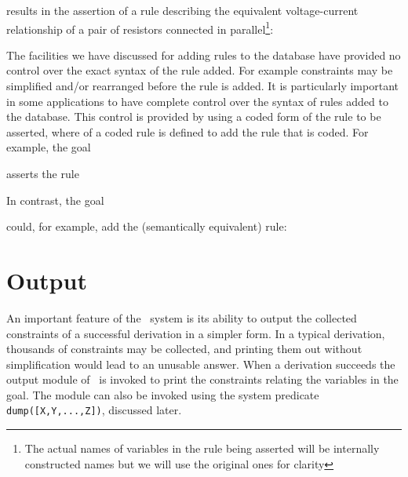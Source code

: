 
\noindent
results in the assertion of a rule describing the 
equivalent voltage-current relationship
of a pair of resistors connected in parallel\footnote{
The actual names of variables in the rule being asserted will be internally
constructed names but we will use the original ones for clarity}:


\noindent
The facilities we have discussed for adding rules to the database have
provided no control over the exact syntax of the rule added.  For example
constraints may be simplified and/or rearranged before the rule is added.
It is particularly important in some applications to have complete control
over the syntax of rules added to the database.
This control is provided by using a coded form of
the rule to be asserted, where  of a
coded rule is defined to add the rule that is coded.  For
example, the goal


\noindent
asserts the rule


\noindent
In contrast, the goal 


\noindent
could, for example, add the (semantically equivalent) rule:


\section{Output}  \label{dump-section} 

An important feature of the \CLPR\ system is its ability
to output the collected constraints of a successful derivation in 
a simpler form.  In a typical derivation, thousands of constraints
may be collected, and printing them out without simplification would
lead to an unusable answer.  When a derivation succeeds the output
module of \CLPR\ is invoked to print the constraints relating the
variables in the goal.  The module can also be invoked using the
system predicate {\tt dump([X,Y,...,Z])}, discussed later.

